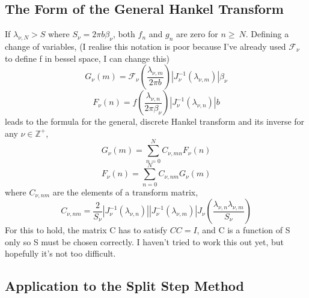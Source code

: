 \documentclass[10pt]{article}
\numberwithin{equation}{section}
\begin{document}
\begin{multicols}{2}
\subsection{The Form of the General Hankel Transform}

If $\lambda_{\nu,N}>S$ where $S_{\nu}=2\pi b\beta_{\nu}$, both $f_{n}$ and  $g_{n}$ are zero for $n\geqslant\ N$. Defining a change of variables, (I realise this notation is poor because I've already used $\mathcal{F}_{\nu}$ to define f in bessel space, I can change this)
\begin{equation}
G_{\nu}(m) = \mathcal{F}_{\nu}(\frac{\lambda_{\nu,m}}{2\pi b})|J_{\nu}^{-1}(\lambda_{\nu,m})|\beta_{\nu}
\end{equation}
\begin{equation}
F_{\nu}(n) = f(\frac{\lambda_{\nu,n}}{2\pi \beta_{\nu}})|J_{\nu}^{-1}(\lambda_{\nu,n})|b
\end{equation}
leads to the formula for the general, discrete Hankel transform and its inverse for any $\nu\in\mathbb{Z}^{+}$,
\begin{equation}
G_{\nu}(m) = \sum_{n=0}^{N}C_{\nu,mn}F_{\nu}(n)
\end{equation}
\begin{equation}
F_{\nu}(n) =  \sum_{n=0}^{N}C_{\nu,nm}G_{\nu}(m)
\end{equation}
where $C_{\nu,nm}$ are the elements of a transform matrix, 
\begin{equation}
C_{\nu,nm} = \frac{2}{S_\nu}|J_{\nu}^{-1}(\lambda_{\nu,n})||J_{\nu}^{-1}(\lambda_{\nu,m})|J_{\nu}(\frac{\lambda_{\nu,n}\lambda_{\nu,m}}{S_\nu})
\end{equation}
For this to hold, the matrix C has to satisfy $CC =I$, and C is a function of S only so S must be chosen correctly. I haven't tried to work this out yet, but hopefully it's not too difficult. 
\subsection{Application to the Split Step Method}


\end{multicols}
\end{document}
